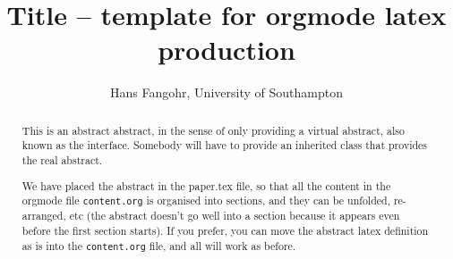 \documentclass{article}
\begin{document}
\title{\sffamily \textbf{Title -- template for orgmode latex production}}

\author{Hans Fangohr, University of Southampton}

\maketitle

\begin{abstract}
  This is an abstract abstract, in the sense of only providing a
  virtual abstract, also known as the interface. Somebody will have to
  provide an inherited class that provides the real abstract.

  We have placed the abstract in the paper.tex file, so that all the
  content in the orgmode file \texttt{content.org} is organised into
  sections, and they can be unfolded, re-arranged, etc (the abstract
  doesn't go well into a section because it appears even before the
  first section starts). If you prefer, you can move the abstract
  latex definition as is into the \texttt{content.org} file, and all
  will work as before.
\end{abstract}







\end{document}
